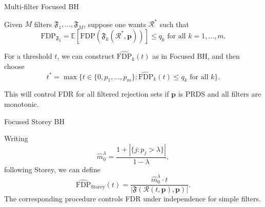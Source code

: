 \documentclass{beamer}
\begin{document}
\begin{frame}{Multi-filter Focused BH}
	
	Given $M$ filters $\mathfrak F_1, \dots, \mathfrak F_M$, suppose one wants $\mathcal R^*$ such that
	\begin{equation*}
	\text{FDP}_{\mathfrak F_k} = \mathbb E[\text{FDP}(\mathfrak F_k(\mathcal R^*, \bm p))] \leq q_k \text{ for all } k = 1, \dots, m.
	\end{equation*}
	
	For a threshold $t$, we can construct $\widehat{\text{FDP}}_k(t)$ as in Focused BH, and then choose
	\begin{equation*}
	t^* = \max\{t \in \{0, p_1, \dots, p_m\}: \widehat{\text{FDP}}_k(t) \leq q_k \text{ for all } k\}.
	\end{equation*}
	
	This will control FDR for all filtered rejection sets if $\bm p$ is PRDS and all filters are monotonic.
	
\end{frame}

\begin{frame}{Focused Storey BH}
	
Writing  
\begin{equation*}
\widehat m_0^\lambda = \frac{1 + |\{j: p_j > \lambda\}|}{1-\lambda},
\end{equation*}
following Storey, we can define
\begin{equation*}
\widehat{\text{FDP}}_{\text{Storey}}(t) = \frac{\widehat m_0^\lambda \cdot t}{|\mathfrak F(\mathcal R(t, \bm p), \bm p)|}.
\end{equation*}
The corresponding procedure controls FDR under independence for simple filters.
	
\end{frame}
\end{document}
